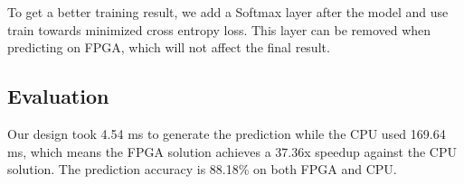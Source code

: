 To get a better training result, we add a Softmax layer after the model and use train towards minimized cross entropy loss.
This layer can be removed when predicting on FPGA, which will not affect the final result.

\subsection{Evaluation}

Our design took 4.54 ms to generate the prediction while the CPU used 169.64 ms, which means the FPGA solution achieves a 37.36x speedup against the CPU solution.
The prediction accuracy is 88.18\% on both FPGA and CPU.

























